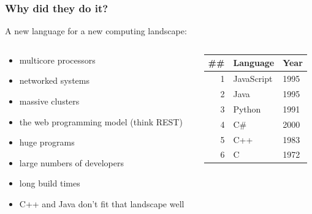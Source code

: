 \documentclass[handout,compress,t,11pt]{beamer}
\begin{document}
\begin{frame}[fragile]
    \frametitle{Why did they do it?}
    A new language for a new computing landscape:
\begin{columns}
\begin{column}{0.5\textwidth}
    \vspace{-0.6\baselineskip}
    \begin{itemize}
    \item multicore processors
    \vspace{0.2\baselineskip}
    \item networked systems
    \vspace{0.2\baselineskip}
    \item massive clusters
    \vspace{0.2\baselineskip}
    \item the web programming model (think REST)
    \vspace{0.2\baselineskip}
    \item huge programs
    \vspace{0.2\baselineskip}
    \item large numbers of developers
    \vspace{0.2\baselineskip}
    \item long build times
    \vspace{0.2\baselineskip}
    \item C++ and Java don't fit that landscape well
    \end{itemize}
\end{column}
\begin{column}{0.45\textwidth}
\vspace{1.4\baselineskip}
\begin{table}[h!]
    \begin{tabular}{r|l|l}
    \textbf{\#\#} & \textbf{Language} & \textbf{Year} \\
    \hline
    1 & JavaScript & 1995 \\
    2 & Java & 1995 \\
    3 & Python & 1991 \\
    4 & C\# & 2000 \\
    5 & C++ & 1983 \\
    6 & C & 1972 \\
    \end{tabular}
\end{table}
\end{column}
\end{columns}
\end{frame}
\end{document}
